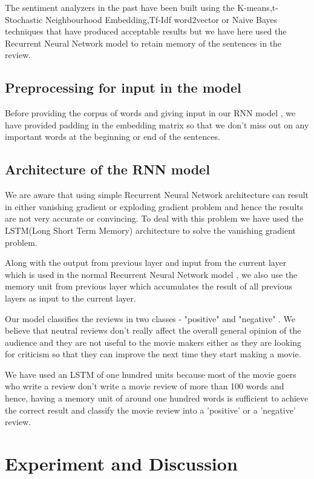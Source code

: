 \documentclass[conference]{IEEEtran}
\begin{document}
The sentiment analyzers in the past have been built using the K-means,t-Stochastic Neighbourhood Embedding,Tf-Idf word2vector or Naive Bayes techniques that have produced acceptable results but we have here used the Recurrent Neural Network model to retain memory of the sentences in the review.

\subsection{Preprocessing for input in the model}
Before providing the corpus of words and giving input in our RNN model , we have provided padding in the embedding matrix so that we don't miss out on any important words at the beginning or end of the sentences.

\subsection{Architecture of the RNN model}
 We are aware that using simple Recurrent Neural Network architecture can result in either vanishing gradient or exploding gradient problem and hence the results are not very accurate or convincing. To deal with this problem we have used the LSTM(Long Short Term Memory) architecture to solve the vanishing gradient problem. 

Along with the output from previous layer and input from the current layer which is used in the normal Recurrent Neural Network model , we also use the memory unit from previous layer which accumulates the result of all previous layers as input to the current layer.

Our model classifies the reviews in two classes - "positive" and "negative" . We believe that neutral reviews don't really affect the overall general opinion of the audience and they are not useful to the movie makers either as they are looking for criticism so that they can improve the next time they start making a movie.

We have used an LSTM of one hundred units because most of the movie goers who write a review don't write a movie review of more than 100 words and hence, having a memory unit of around one hundred words is sufficient to achieve the correct result and classify the movie review into a 'positive' or a 'negative' review.

\section{Experiment and Discussion}
\end{document}

